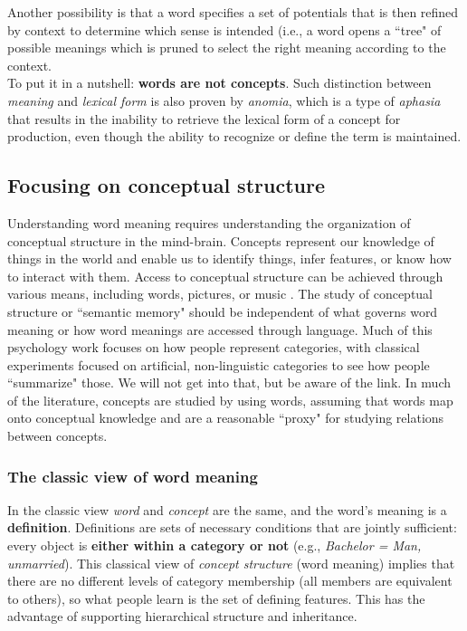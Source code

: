 Another possibility is that a word specifies a set of potentials that is then refined by context to determine which sense is intended (i.e., a word opens a ``tree" of possible meanings which is pruned to select the right meaning according to the context.\\

To put it in a nutshell: \textbf{words are not concepts}. Such distinction between \textit{meaning} and \textit{lexical form} is also proven by \textit{anomia}, which is a type of \textit{aphasia} that results in the inability to retrieve the lexical form of a concept for production, even though the ability to recognize or define the term is maintained.

\subsection{Focusing on conceptual structure}
Understanding word meaning requires understanding the organization of conceptual structure in the mind-brain. Concepts represent our knowledge of things in the world and enable us to identify things, infer features, or know how to interact with them. Access to conceptual structure can be achieved through various means, including words, pictures, or music \notet. The study of conceptual structure or ``semantic memory" should be independent of what governs word meaning or how word meanings are accessed through language. Much of this psychology work focuses on how people represent categories, with classical experiments focused on artificial, non-linguistic categories to see how people ``summarize" those. We will not get into that, but be aware of the link.
In much of the literature, concepts are studied by using words, assuming that words map onto conceptual knowledge and are a reasonable ``proxy" for studying relations between concepts.


\subsubsection{The classic view of word meaning}
In the classic view \textit{word} and \textit{concept} are the same, and the word's meaning is a \textbf{definition}. Definitions are sets of necessary conditions that are jointly sufficient: every object is \textbf{either within a category or not} (e.g., \textit{Bachelor = Man, unmarried}).
This classical view of \textit{concept structure} (word meaning) implies that there are no different levels of category membership (all members are equivalent to others), so what people learn is the set of defining features. This has the advantage of supporting hierarchical structure and inheritance.


